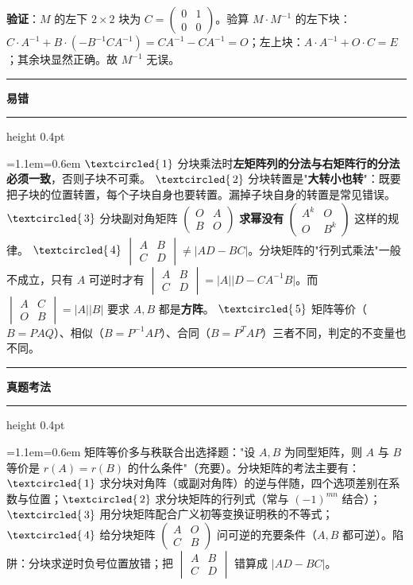\documentclass[11pt,openany,UTF8]{ctexbook}
\newcommand{\circled}[1]{\textcircled{\scriptsize\,#1}}
\newcommand{\callouthead}[2]{%
  \par\addvspace{7pt}\noindent
  {\color{#1}\rule[-0.15em]{3pt}{1.05em}}\hspace{0.5em}%
  {\bfseries\color{#1}#2}\par\nobreak\vspace{-0.35em}%
  {\color{rulesep}\hrule height 0.4pt}\nobreak\vspace{0.45em}%
  \begingroup\small\setlength{\parindent}{0pt}%
  \leftskip=1.1em\rightskip=0.6em\noindent\ignorespaces}
\newcommand{\calloutend}{\par\endgroup\addvspace{7pt}}
\newenvironment{callwarn}[1]{\callouthead{warnbar}{#1}}{\calloutend}
\newenvironment{callexam}[1]{\callouthead{exambar}{#1}}{\calloutend}
\begin{document}
\textbf{验证}：$M$ 的左下 $2\times2$ 块为 $C=\begin{pmatrix}0&1\\0&0\end{pmatrix}$。验算 $M\cdot M^{-1}$ 的左下块：$C\cdot A^{-1}+B\cdot(-B^{-1}CA^{-1})=CA^{-1}-CA^{-1}=O$；左上块：$A\cdot A^{-1}+O\cdot C=E$；其余块显然正确。故 $M^{-1}$ 无误。

\begin{callwarn}{易错}
$\circled{1}$ 分块乘法时\textbf{左矩阵列的分法与右矩阵行的分法必须一致}，否则子块不可乘。 $\circled{2}$ 分块转置是"\textbf{大转小也转}"：既要把子块的位置转置，每个子块自身也要转置。漏掉子块自身的转置是常见错误。 $\circled{3}$ 分块副对角矩阵 $\begin{pmatrix}O&A\\B&O\end{pmatrix}$ \textbf{求幂没有} $\begin{pmatrix}A^k&O\\O&B^k\end{pmatrix}$ 这样的规律。 $\circled{4}$ $\begin{vmatrix}A&B\\C&D\end{vmatrix}\ne\vert AD-BC\vert$。分块矩阵的"行列式乘法"一般不成立，只有 $A$ 可逆时才有 $\begin{vmatrix}A&B\\C&D\end{vmatrix}=\vert A\vert\vert D-CA^{-1}B\vert$。而 $\begin{vmatrix}A&C\\O&B\end{vmatrix}=\vert A\vert\vert B\vert$ 要求 $A,B$ 都是\textbf{方阵}。 $\circled{5}$ 矩阵等价（$B=PAQ$）、相似（$B=P^{-1}AP$）、合同（$B=P^TAP$）三者不同，判定的不变量也不同。

\end{callwarn}

\begin{callexam}{真题考法}
矩阵等价多与秩联合出选择题："设 $A,B$ 为同型矩阵，则 $A$ 与 $B$ 等价是 $r(A)=r(B)$ 的什么条件"（充要）。分块矩阵的考法主要有：$\circled{1}$ 求分块对角阵（或副对角阵）的逆与伴随，四个选项差别在系数与位置；$\circled{2}$ 求分块矩阵的行列式（常与 $(-1)^{mn}$ 结合）；$\circled{3}$ 用分块矩阵配合广义初等变换证明秩的不等式；$\circled{4}$ 给分块矩阵 $\begin{pmatrix}A&O\\C&B\end{pmatrix}$ 问可逆的充要条件（$A,B$ 都可逆）。陷阱：分块求逆时负号位置放错；把 $\begin{vmatrix}A&B\\C&D\end{vmatrix}$ 错算成 $\vert AD-BC\vert$。

\end{callexam}
\end{document}
